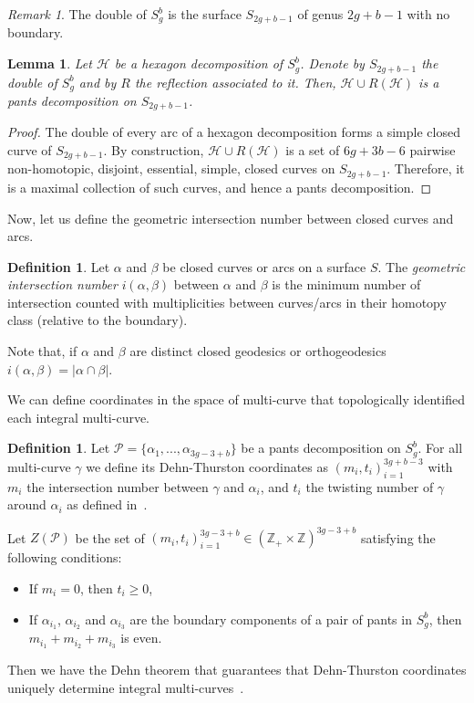 \documentclass[a4paper,12pt]{article}
\newtheorem{lemme}[theorem]{Lemma}
\theoremstyle{definition}
\newtheorem{definition}[theorem]{Definition}
\theoremstyle{remark}
\newtheorem{rem}[theorem]{Remark}
\begin{document}
\begin{rem}
    The double of $S_g^b$ is the surface $S_{2g+b-1}$ of genus $2g+b-1$ with no boundary.
\end{rem}

\begin{lemme}\label{lem:HexaToPant}
    Let $\mathcal{H}$ be a hexagon decomposition of $S_g^b$. Denote by $S_{2g+b-1}$ the double of $S_g^b$ and by $R$ the reflection associated to it.
    Then, $\mathcal{H} \cup R(\mathcal{H})$ is a pants decomposition on $S_{2g+b-1}$.
\end{lemme}

\begin{proof}
    The double of every arc of a hexagon decomposition forms a simple closed curve of $S_{2g+b-1}$. By construction, $\mathcal{H} \cup R(\mathcal{H})$ is a set of $6g+3b-6$ pairwise non-homotopic, disjoint, essential, simple, closed curves on $S_{2g+b-1}$. Therefore, it is a maximal collection of such curves, and hence a pants decomposition.
\end{proof}

Now, let us define the geometric intersection number between closed curves and arcs.

\begin{definition}
    Let $\alpha$ and $\beta$ be closed curves or arcs on a surface $S$. The \emph{geometric intersection number} $i(\alpha,\beta)$ between $\alpha$ and $\beta$ is the minimum number of intersection counted with multiplicities between curves/arcs in their homotopy class (relative to the boundary).
\end{definition}

Note that, if $\alpha$ and $\beta$ are distinct closed geodesics or orthogeodesics \mbox{$i(\alpha, \beta)=|\alpha \cap \beta |$}.

We can define coordinates in the space of multi-curve that topologically identified each integral multi-curve. 

\begin{definition}
    Let $\mathcal{P}=\{\alpha_1,...,\alpha_{3g-3+b}\}$ be a pants decomposition on $S_g^{b}$. For all multi-curve $\gamma$ we define its Dehn-Thurston coordinates as $(m_i,t_i)_{i=1}^{3g+b-3}$ with $m_i$ the intersection number between $\gamma$ and $\alpha_i$, and $t_i$ the twisting number of $\gamma$ around $\alpha_i$ as defined in~\cite{DehnThurstonCoord}.
\end{definition}


Let $Z(\mathcal{P})$ be the set of $(m_i,t_i)^{3g-3+b}_{i=1} \in (\mathbb{Z}_+ \times \mathbb{Z})^{3g-3+b}$ satisfying the following conditions:
\begin{itemize}
    \item If $m_i =0$, then $t_i\geqslant0$,
    \item If $\alpha_{i_1}$, $\alpha_{i_2}$ and $\alpha_{i_3}$ are the boundary components of a pair of pants in $S_g^{b}$, then $m_{i_1}+m_{i_2}+m_{i_3}$ is even.
\end{itemize}
Then we have the Dehn theorem that guarantees that Dehn-Thurston coordinates uniquely determine integral multi-curves~\cite{PennerHarer}.
\end{document}
